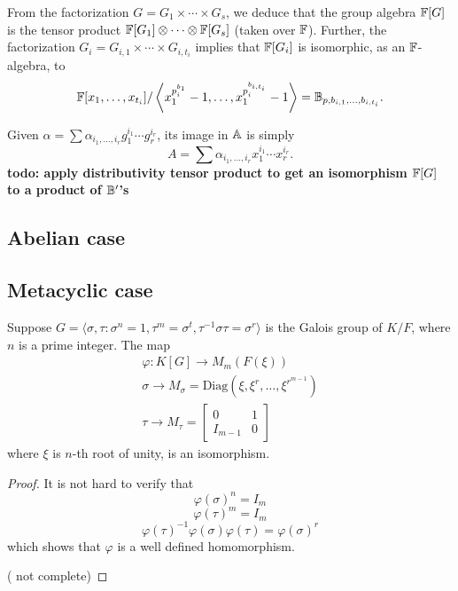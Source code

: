 From the factorization $G = G_1 \times \cdots \times G_s$, we deduce
that the group algebra $\mathbb{F}[G]$ is the tensor product $\mathbb{F}[G_1]
\otimes \cdots \otimes \mathbb{F}[G_s]$ (taken over $\mathbb{F}$). Further, the 
factorization $G_i = G_{i,1} \times \cdots \times G_{i,t_i}$
implies that $\mathbb{F}[G_i]$ is isomorphic, as an $\mathbb{F}$-algebra, to
$$\mathbb{F}[x_{1},\dots,x_{t_i}]/\left \langle x_{1}^{p_i^{b_{1}}}-1,\dots,x_{1}^{p_i^{b_{i,t_i}}}-1\right\rangle
=\mathbb{B}_{p,b_{i,1},\dots,b_{i,t_i}}.$$


Given $\alpha = \sum \alpha_{i_1,\dots,i_r} g_1^{i_1}\cdots
g_r^{i_r}$, its image in $\mathbb{A}$ is simply 
$$A= \sum
\alpha_{i_1,\dots,i_r} x_1^{i_1}\cdots x_r^{i_r}.$$
{\bf todo: apply distributivity tensor product to get an isomorphism
$\mathbb{F}[G]$ to a product of $\mathbb{B}'$'s}







\subsection{Abelian case}

\subsection{Metacyclic case}

\begin{proposition}
Suppose $G = \langle \sigma , \tau : \sigma^n = 1, \tau^m = \sigma^t, \tau^{-1} \sigma \tau = \sigma^r \rangle$ is the Galois group 
of $K/F$, where $n$ is a prime integer. The map 
\begin{equation}
\begin{split}
\varphi: K[G] \longrightarrow M_{m}(F(\xi))\\
\sigma \longrightarrow M_{\sigma} = \mathrm{Diag}(\xi, \xi^r, \ldots , \xi^{r^{m-1}})\\
\tau \longrightarrow 
M_{\tau} = \left[ \begin{array}{l|l}
0 & 1\\
\hline
I_{m-1}& 0
\end{array} \right] 
\end{split}
\end{equation}
where $\xi$ is $n$-th root of unity, is an isomorphism.
\end{proposition}

\begin{proof}
It is not hard to verify that 
$$\varphi(\sigma)^n = I_m$$
$$\varphi(\tau)^m = I_m$$
$$\varphi(\tau)^{-1}\varphi(\sigma) \varphi(\tau) = \varphi(\sigma)^r$$
which shows that $\varphi$ is a well defined homomorphism.



({\color{red} not complete})
\end{proof}

